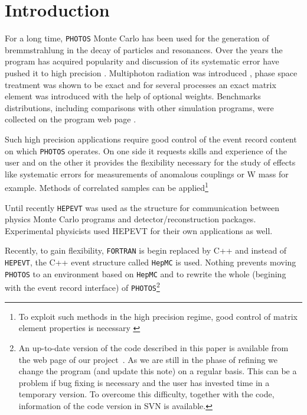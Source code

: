 \documentclass[]{Photos_interface_design}
\begin{document}
\maketitle

\tableofcontents{}

\newpage

\section{Introduction}
For a long time, {\tt PHOTOS} Monte Carlo \cite{Barberio:1990ms,Barberio:1993qi} has been used for the generation of bremmstrahlung in the decay of particles and resonances. Over the years the program has acquired
popularity and discussion of its systematic error have pushed it to high 
precision \cite{Golonka:2006tw}. Multiphoton radiation was introduced \cite{Golonka:2005pn}, phase space treatment was shown to be exact \cite{Nanava:2006vv} and for several processes \cite{Golonka:2006tw,Nanava:2006vv,Nanava:2009vg}
an exact matrix element was introduced with the help of optional weights.
Benchmarks distributions, including comparisons with  
other simulation programs, were collected on the program web page \cite{Photos_tests}. 

 Such high precision applications require good control of the event record content on which {\tt PHOTOS} operates. On one side it 
requests skills and experience of the user and on the other it provides 
the flexibility necessary for the study of effects like systematic errors for 
measurements of anomalous couplings or W mass for example. Methods of 
correlated samples  can be applied\footnote{To exploit such methods in 
the high precision regime, good control of matrix element properties is necessary
\cite{Kleiss:1990jv}} 

Until recently {\tt HEPEVT} was used as the structure for 
communication between physics Monte Carlo programs and detector/reconstruction 
packages. Experimental physicists used HEPEVT 
for their own applications  as well.

Recently, to gain  flexibility, {\tt FORTRAN} is begin replaced by C++ and 
instead of {\tt HEPEVT}, the C++ event structure called {\tt HepMC} \cite{Dobbs:2001ck}
is used. Nothing prevents 
moving {\tt PHOTOS} to an environment based on  {\tt HepMC}
and to rewrite the whole (begining with the event record interface)
of {\tt PHOTOS}\footnote{An up-to-date version of the code described in this paper is
available from the web page of our project~\cite{photosC++}. 
As we are still in the phase of refining
we change the program (and update this note) on a regular basis. 
This can be a problem if bug fixing is necessary and the user has invested time 
in a temporary version. To overcome this difficulty, 
together with the code, information of the code version in 
SVN is available.  }
\end{document}
